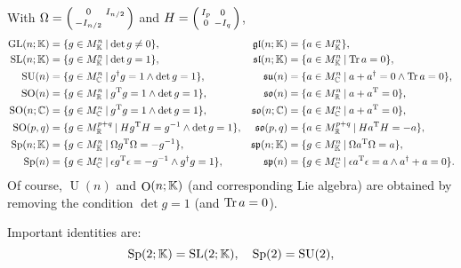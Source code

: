 \documentclass[CheatSheet]{subfiles}
\begin{document}
With $\Omega=\left(\begin{smallmatrix}0&I_{n/2}\\-I_{n/2}\end{smallmatrix}\right)$ and $H=\left(\begin{smallmatrix}I_p&0\\0&-I_q\end{smallmatrix}\right)$,
\begin{align}
 \mathop{\mathrm  {GL}}(n;\KK) &= \{g\in M^n_\KK\mathbin\mid \det g\neq 0\},&
 \mathop{\mathfrak{gl}}(n;\KK) &= \{a\in M^n_\KK\},\\
%
 \mathop{\mathrm  {SL}}(n;\KK) &= \{g\in M^n_\KK\mathbin\mid \det g=1\},&
 \mathop{\mathfrak{sl}}(n;\KK) &= \{a\in M^n_\KK\mathbin\mid \Tr a=0\},\\
%
 \mathop{\mathrm  {SU}}(n) &= \{g\in M^n_{\mathbb C}\mathbin\mid g^\dagger g=1\land\det g=1\},&
 \mathop{\mathfrak{su}}(n) &= \{a\in M^n_{\mathbb C}\mathbin\mid a+a^\dagger=0\land\Tr a=0\},\\
%
 \mathop{\mathrm  {SO}}(n) &= \{g\in M^n_{\mathbb R}\mathbin\mid g^\TT g=1\land\det g=1\},&
 \mathop{\mathfrak{so}}(n) &= \{a\in M^n_{\mathbb R}\mathbin\mid a+a^\TT=0\},\\
%
 \mathop{\mathrm  {SO}}(n;\mathbb C) &= \{g\in M^n_{\mathbb C}\mathbin\mid g^\TT g=1\land\det g=1\},&
 \mathop{\mathfrak{so}}(n;\mathbb C) &= \{a\in M^n_{\mathbb C}\mathbin\mid a+a^\TT=0\},\\
%
 \mathop{\mathrm  {SO}}(p,q) &= \{g\in M^{p+q}_{\mathbb R}\mathbin\mid H g^\TT H=g^{-1}\land\det g=1\},&
 \mathop{\mathfrak{so}}(p,q) &= \{a\in M^{p+q}_{\mathbb R}\mathbin\mid H a^\TT H=-a\},\\
%
 \mathop{\mathrm  {Sp}}(n;\KK) &= \{g\in M^n_\KK\mathbin\mid \Omega g^\TT \Omega=-g^{-1}\},&
 \mathop{\mathfrak{sp}}(n;\KK) &= \{g\in M^n_\KK\mathbin\mid \Omega a^\TT \Omega=a\},\\
%
 \mathop{\mathrm  {Sp}}(n) &= \{g\in M^n_{\mathbb C}\mathbin\mid \epsilon g^\TT \epsilon=-g^{-1}\land g^\dagger g=1\},&
 \mathop{\mathfrak{sp}}(n) &= \{g\in M^n_{\mathbb C}\mathbin\mid \epsilon a^\TT \epsilon=a\land a^\dagger+a=0\}.
\end{align}
Of course, $\mathop{\mathrm{U}}(n)$ and $\mathop{\mathrm{O}}(n;{\mathbb{K}})$ (and corresponding Lie algebra) are obtained by removing the condition $\det g=1$ (and $\operatorname{\mathrm{Tr}} a=0$).


Important identities are:
\begin{equation}
 \operatorname{\mathrm Sp}(2;{\mathbb{K}})=\operatorname{\mathrm SL}(2;{\mathbb{K}}),\quad \operatorname{\mathrm Sp}(2)=\operatorname{\mathrm SU}(2),
\end{equation}
\end{document}

